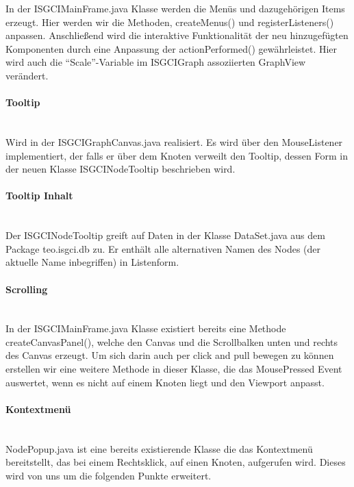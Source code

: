 \documentclass[10pt,a4paper]{article}
\begin{document}
In der ISGCIMainFrame.java Klasse werden die Menüs und dazugehörigen Items erzeugt. Hier werden wir die Methoden, createMenus() und registerListeners() anpassen. Anschließend wird die interaktive Funktionalität der neu hinzugefügten Komponenten durch eine Anpassung der actionPerformed() gewährleistet. Hier wird auch die "`Scale"'-Variable im ISGCIGraph assoziierten GraphView verändert.

\paragraph{Tooltip}\ \\ 

Wird in der ISGCIGraphCanvas.java realisiert. Es wird über den MouseListener implementiert, der falls er über dem Knoten verweilt den Tooltip, dessen Form in der neuen Klasse ISGCINodeTooltip beschrieben wird.

\paragraph{Tooltip Inhalt}\ \\ 

 Der ISGCINodeTooltip greift auf Daten in der Klasse DataSet.java aus dem Package teo.isgci.db zu. Er enthält alle alternativen Namen des Nodes (der aktuelle Name inbegriffen) in Listenform.


\paragraph{Scrolling}\ \\ 

In der ISGCIMainFrame.java Klasse existiert bereits eine Methode createCanvasPanel(), welche den Canvas und die Scrollbalken unten und rechts des Canvas erzeugt. Um sich darin auch per click and pull bewegen zu können erstellen wir eine weitere Methode in dieser Klasse, die das MousePressed Event auswertet, wenn es nicht auf einem Knoten liegt und den Viewport anpasst.

\paragraph{Kontextmenü}\ \\ 

NodePopup.java ist eine bereits existierende Klasse die das Kontextmenü bereitstellt, das bei einem Rechtsklick, auf einen Knoten, aufgerufen wird. Dieses wird von uns um die folgenden Punkte erweitert. 
\end{document}
